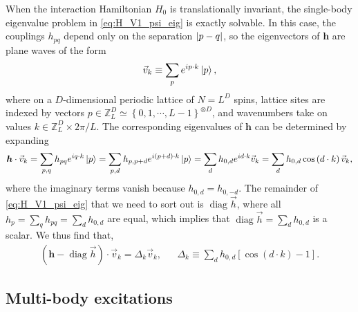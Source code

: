 \documentclass[nofootinbib,notitlepage,11pt]{revtex4-2}
\newcommand{\p}[1]{\left(#1\right)} %
\renewcommand{\sp}[1]{\left[#1\right]} %
\renewcommand{\set}[1]{\left\{#1\right\}} %
\renewcommand{\c}{\cdot} %
\newcommand{\m}{\bm} %
\renewcommand{\v}{\vec} %
\newcommand{\1}{\mathds{1}}
\newcommand{\ZZ}{\mathbb{Z}}
\DeclareMathOperator{\diag}{diag}
\begin{document}
When the interaction Hamiltonian $H_0$ is translationally invariant,
the single-body eigenvalue problem in \eqref{eq:H_V1_psi_eig} is
exactly solvable.  In this case, the couplings $h_{pq}$ depend only on
the separation $\abs{p-q}$, so the eigenvectors of $\m h$ are plane
waves of the form
\begin{align}
  \v v_k \equiv \sum_p e^{ip\c k} \ket{p},
\end{align}
where on a $D$-dimensional periodic lattice of $N=L^D$ spins, lattice
sites are indexed by vectors
$p\in\ZZ_L^D\simeq\set{0,1,\cdots,L-1}^{\otimes D}$, and wavenumbers
take on values $k\in\ZZ_L^D\times2\pi/L$.  The corresponding
eigenvalues of $\m h$ can be determined by expanding
\begin{align}
  \m h\c\v v_k = \sum_{p,q} h_{pq} e^{iq\c k} \ket{p}
  = \sum_{p,d} h_{p,p+d} e^{i\p{p+d}\c k} \ket{p}
  = \sum_d h_{0,d} e^{id\c k} \v v_k
  = \sum_d h_{0,d} \cos\p{d\c k} \v v_k,
\end{align}
where the imaginary terms vanish because $h_{0,d}=h_{0,-d}$.  The
remainder of \eqref{eq:H_V1_psi_eig} that we need to sort out is
$\diag\v h$, where all $h_p=\sum_qh_{pq}=\sum_dh_{0,d}$ are equal,
which implies that $\diag\v h=\sum_dh_{0,d}$ is a scalar.  We thus
find that,
\begin{align}
  \p{\m h - \diag\v h}\c\v v_k = \Delta_k \v v_k,
  &&
  \Delta_k \equiv \sum_d h_{0,d} \sp{\cos\p{d\c k}-1}.
\end{align}

\subsection{Multi-body excitations}
\label{sec:eigenstates}
\end{document}
